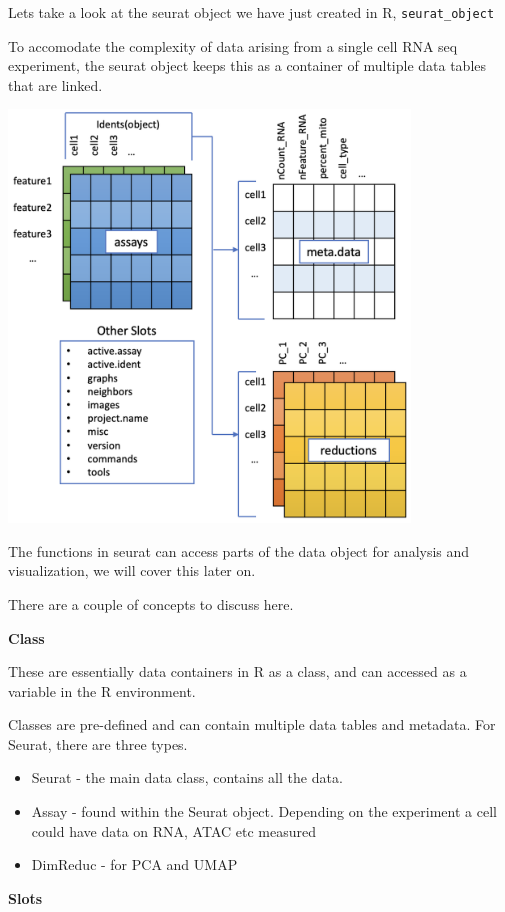 \documentclass[
]{book}
\providecommand{\tightlist}{%
  \setlength{\itemsep}{0pt}\setlength{\parskip}{0pt}}
\begin{document}
Lets take a look at the seurat object we have just created in R, \texttt{seurat\_object}

To accomodate the complexity of data arising from a single cell RNA seq experiment, the seurat object keeps this as a container of multiple data tables that are linked.

\includegraphics[width=0.8\textwidth,height=\textheight]{images/seuratobject.png}

The functions in seurat can access parts of the data object for analysis and visualization, we will cover this later on.

There are a couple of concepts to discuss here.

\textbf{Class}

These are essentially data containers in R as a class, and can accessed as a variable in the R environment.

Classes are pre-defined and can contain multiple data tables and metadata. For Seurat, there are three types.

\begin{itemize}
\tightlist
\item
  Seurat - the main data class, contains all the data.
\item
  Assay - found within the Seurat object. Depending on the experiment a cell could have data on RNA, ATAC etc measured
\item
  DimReduc - for PCA and UMAP
\end{itemize}

\textbf{Slots}
\end{document}
